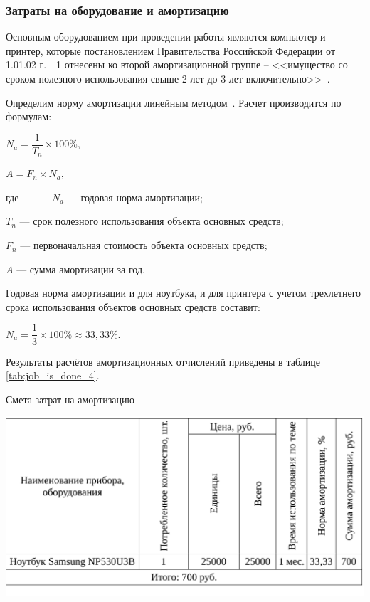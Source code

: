 \subsubsection{Затраты на оборудование и амортизацию}

Основным оборудованием при проведении работы являются компьютер и принтер, которые 
постановлением Правительства Российской Федерации от 1.01.02 г.~\textnumero~1 отнесены ко второй амортизационной группе – 
<<имущество со сроком полезного использования свыше 2 лет до 3 лет включительно>>~\cite{amort}. 

Определим норму амортизации линейным методом~\cite{frolova}. Расчет производится по формулам:

\begin{center}
 $ N_{a} = \dfrac{1}{T_{n}}\times 100\%,$
 \end{center}
 \begin{center}
 $ A = F_{n}\times N_{a}, $
\end{center}
где~~~~~ \ $N_{a}$ --- годовая норма амортизации;

$T_{n}$ --- срок полезного использования объекта основных средств;

$F_{n}$ --- первоначальная стоимость объекта основных средств;

$A$ --- сумма амортизации за год.

Годовая норма амортизации и для ноутбука, и для принтера с учетом трехлетнего срока 
использования объектов основных средств составит:
\begin{center}
$ N_{a} = \dfrac{1}{3}\times 100\% \approx 33,33\%.$\\
\end{center}

Результаты расчётов амортизационных отчислений приведены в таблице \ref{tab:job_is_done_4}.

\begin{table}[!ht]
\caption{Смета затрат на амортизацию}
\centering
\includegraphics[page=1, width=1\linewidth]{tables/economics/schedule_4.pdf}
\label{tab:job_is_done_4}
\end{table}

